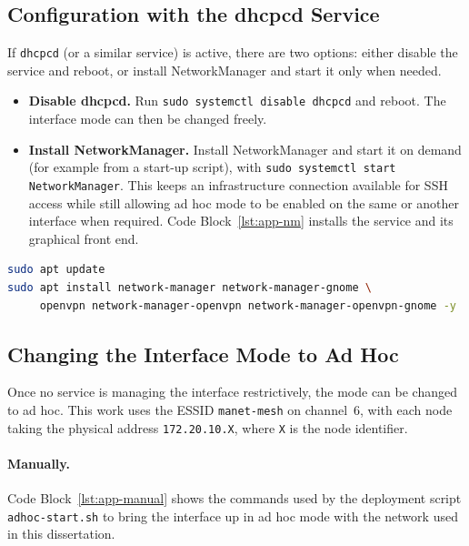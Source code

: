 \subsection{Configuration with the dhcpcd Service}
\label{subsec:app-dhcpcd}

If \texttt{dhcpcd} (or a similar service) is active, there are two options:
either disable the service and reboot, or install NetworkManager and start it
only when needed.

\begin{itemize}
  \item \textbf{Disable dhcpcd.} Run \texttt{sudo systemctl disable dhcpcd} and
  reboot. The interface mode can then be changed freely.
  \item \textbf{Install NetworkManager.} Install NetworkManager and start it on
  demand (for example from a start-up script), with \texttt{sudo systemctl start
  NetworkManager}. This keeps an infrastructure connection available for SSH
  access while still allowing ad hoc mode to be enabled on the same or another
  interface when required. Code Block~\ref{lst:app-nm} installs the service and
  its graphical front end.
\end{itemize}

\begin{lstlisting}[language=bash,caption={Installation of the NetworkManager service},label=lst:app-nm]
sudo apt update
sudo apt install network-manager network-manager-gnome \
     openvpn network-manager-openvpn network-manager-openvpn-gnome -y
\end{lstlisting}

\subsection{Changing the Interface Mode to Ad Hoc}
\label{subsec:app-mode}

Once no service is managing the interface restrictively, the mode can be changed
to ad hoc. This work uses the ESSID \texttt{manet-mesh} on channel~6, with each
node taking the physical address \texttt{172.20.10.X}, where \texttt{X} is the
node identifier.

\paragraph{Manually.} Code Block~\ref{lst:app-manual} shows the commands used by
the deployment script \texttt{adhoc-start.sh} to bring the interface up in ad hoc
mode with the network used in this dissertation.

